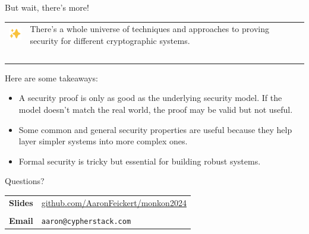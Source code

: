 \documentclass[aspectratio=169]{beamer}
\begin{document}
\begin{frame}{But wait, there's more!}
    \begin{tabular}{>{\arraybackslash}m{40px} >{\arraybackslash}m{320px}}
        \includegraphics[width=30px]{images/sparkles.png} & There's a whole universe of techniques and approaches to proving security for different cryptographic systems. \\~\\
    \end{tabular}

    Here are some takeaways:
    \begin{itemize}
        \item A security proof is only as good as the underlying security model. If the model doesn't match the real world, the proof may be valid but not useful.
        \item Some common and general security properties are useful because they help layer simpler systems into more complex ones.
        \item Formal security is tricky but essential for building robust systems.
    \end{itemize}
\end{frame}

\begin{frame}{Questions?}
	\Large
	\begin{center}
		\begin{tabular}{ll}
			\textbf{Slides} & \url{github.com/AaronFeickert/monkon2024} \\
			\\
			\textbf{Email} & \texttt{aaron@cypherstack.com}
		\end{tabular}
	\end{center}
\end{frame}
\end{document}
